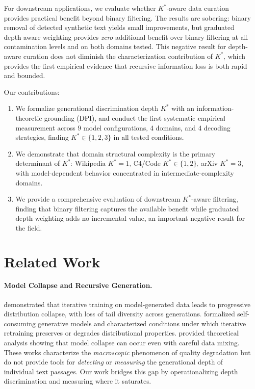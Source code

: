 \documentclass[11pt]{article}
\newcommand{\kstar}{K^*}
\begin{document}
For downstream applications, we evaluate whether $\kstar$-aware data curation provides practical benefit beyond binary filtering.
The results are sobering: binary removal of detected synthetic text yields small improvements, but graduated depth-aware weighting provides \emph{zero} additional benefit over binary filtering at all contamination levels and on both domains tested.
This negative result for depth-aware curation does not diminish the characterization contribution of $\kstar$, which provides the first empirical evidence that recursive information loss is both rapid and bounded.

Our contributions:
\begin{enumerate}[nosep]
    \item We formalize generational discrimination depth $\kstar$ with an information-theoretic grounding (DPI), and conduct the first systematic empirical measurement across 9 model configurations, 4 domains, and 4 decoding strategies, finding $\kstar \in \{1,2,3\}$ in all tested conditions.
    \item We demonstrate that domain structural complexity is the primary determinant of $\kstar$: Wikipedia $\kstar{=}1$, C4/Code $\kstar \in \{1,2\}$, arXiv $\kstar{=}3$, with model-dependent behavior concentrated in intermediate-complexity domains.
    \item We provide a comprehensive evaluation of downstream $\kstar$-aware filtering, finding that binary filtering captures the available benefit while graduated depth weighting adds no incremental value, an important negative result for the field.
\end{enumerate}


\section{Related Work}

\paragraph{Model Collapse and Recursive Generation.}
\citet{shumailov2024ai} demonstrated that iterative training on model-generated data leads to progressive distribution collapse, with loss of tail diversity across generations.
\citet{alemohammad2024selfconsuming} formalized self-consuming generative models and characterized conditions under which iterative retraining preserves or degrades distributional properties.
\citet{dohmatob2024tale} provided theoretical analysis showing that model collapse can occur even with careful data mixing.
These works characterize the \emph{macroscopic} phenomenon of quality degradation but do not provide tools for \emph{detecting} or \emph{measuring} the generational depth of individual text passages.
Our work bridges this gap by operationalizing depth discrimination and measuring where it saturates.
\end{document}
